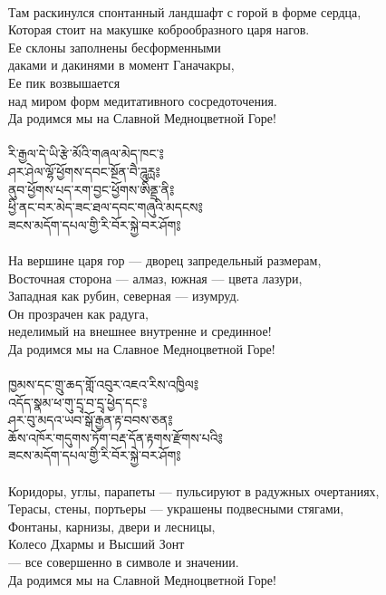 \\
Там раскинулся спонтанный ландшафт с горой в форме сердца,\\
Которая стоит на макушке коброобразного царя нагов.\\
Ее склоны заполнены бесформенными \\ \indent даками и дакинями в момент Ганачакры,\\
Ее пик возвышается \\ \indent над миром форм медитативного сосредоточения.\\
Да родимся мы на Славной Медноцветной Горе!\\
\\
{\ti རི་རྒྱལ་དེ་ཡི་རྩེ་མོའི་གཞལ་མེད་ཁང་༔\\
ཤར་ཤེལ་ལྷོ་ཕྱོགས་དབང་སྔོན་བཻ་ཌཱུརྻ༔\\
ནུབ་ཕྱོགས་པད་རག་བྱང་ཕྱོགས་ཨིནྡྲ་ནི༔\\
ཕྱི་ནང་བར་མེད་ཟང་ཐལ་དབང་གཞུའི་མདངས༔\\
ཟངས་མདོག་དཔལ་གྱི་རི་བོར་སྐྱེ་བར་ཤོག༔}\\
\\
На вершине царя гор — дворец запредельный размерам,\\
Восточная сторона — алмаз, южная — цвета лазури,\\
Западная как рубин, северная — изумруд.\\
Он прозрачен как радуга, \\ \indent неделимый на внешнее внутренне и срединное!\\
Да родимся мы на Славное Медноцветной Горе!\\
\\
\newpage
{\ti ཁྱམས་དང་གྲུ་ཆད་གློ་འབུར་འཇའ་རིས་འཁྱིལ༔\\
འདོད་སྣམ་ཕ་གུ་དྲྭ་བ་དྲྭ་ཕྱེད་དང་༔\\
ཤར་བུ་མདའ་ཡབ་སྒོ་རྒྱན་རྟ་བབས་ཅན༔\\
ཆོས་འཁོར་གདུགས་ཏོག་བརྡ་དོན་རྟགས་རྫོགས་པའི༔\\
ཟངས་མདོག་དཔལ་གྱི་རི་བོར་སྐྱེ་བར་ཤོག༔}\\
\\
Коридоры, углы, парапеты — пульсируют в радужных очертаниях,\\
Терасы, стены, портьеры — украшены подвесными стягами,\\
Фонтаны, карнизы, двери и лесницы,\\
Колесо Дхармы и Высший Зонт \\ \indent — все совершенно в символе и значении.\\
Да родимся мы на Славной Медноцветной Горе!\\
